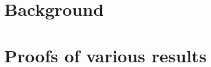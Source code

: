 \documentclass[12pt]{article}
\begin{document}

\clearpage




\appendix
{}

\section{Background}\label{appendix:background_chapter}

\clearpage

\section{Proofs of various results}\label{appendix:supplementary_chapter}

\clearpage


% 
% 
\printbibliography
{}
\end{document}
